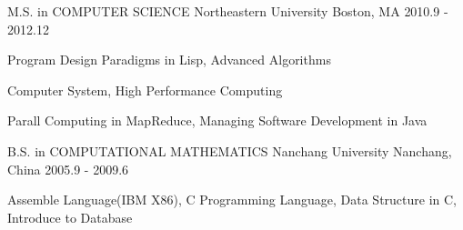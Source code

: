 


\begin{cventries}


\cventry
{M.S. in COMPUTER SCIENCE} %
{Northeastern University} %
{Boston, MA} %
{2010.9 - 2012.12} %
{ %
\begin{cvitems}
\item {Program Design Paradigms in Lisp,  Advanced Algorithms}
\item {Computer System,  High Performance Computing}
\item {Parall Computing in MapReduce,  Managing Software Development in Java}
\end{cvitems}
}



\cventry
{B.S. in COMPUTATIONAL MATHEMATICS} %
{Nanchang University} %
{Nanchang, China} %
{2005.9 - 2009.6} %
{ %
\begin{cvitems}
\item {Assemble Language(IBM X86),  C Programming Language,  Data Structure in C, Introduce to Database}
\end{cvitems}
}


\end{cventries}